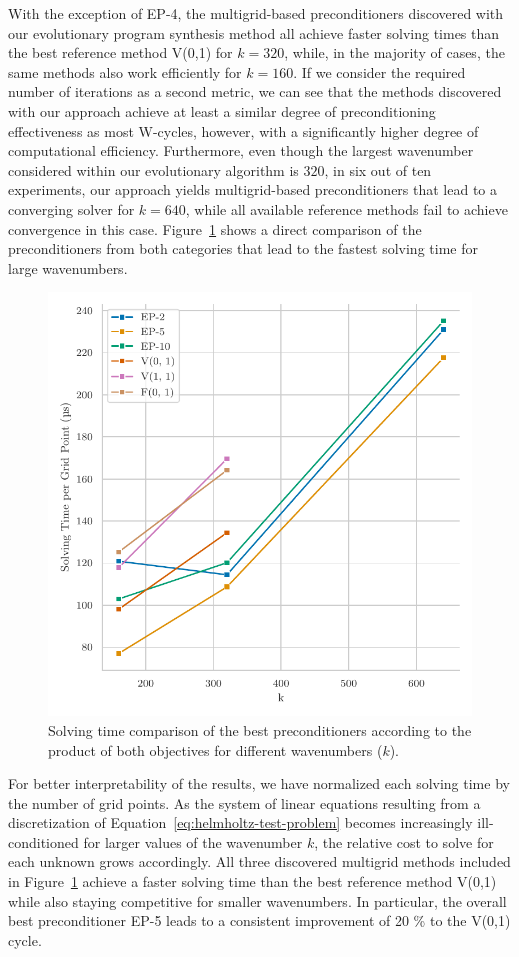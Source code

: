 With the exception of EP-4, the multigrid-based preconditioners discovered with our evolutionary program synthesis method all achieve faster solving times than the best reference method V(0,1) for $k = 320$, while, in the majority of cases, the same methods also work efficiently for $k = 160$.
If we consider the required number of iterations as a second metric, we can see that the methods discovered with our approach achieve at least a similar degree of preconditioning effectiveness as most W-cycles, however, with a significantly higher degree of computational efficiency.
Furthermore, even though the largest wavenumber considered within our evolutionary algorithm is $320$, in six out of ten experiments, our approach yields multigrid-based preconditioners that lead to a converging solver for $k = 640$, while all available reference methods fail to achieve convergence in this case.
Figure~\ref{fig:helmholtz-solving-time-comparison} shows a direct comparison of the preconditioners from both categories that lead to the fastest solving time for large wavenumbers.
\begin{figure}
	\includegraphics[width=\textwidth]{figures/solving-time.pdf}
	\caption{Solving time comparison of the best preconditioners according to the product of both objectives for different wavenumbers ($k$).}
	\label{fig:helmholtz-solving-time-comparison}
\end{figure} 
For better interpretability of the results, we have normalized each solving time by the number of grid points.
As the system of linear equations resulting from a discretization of Equation~\ref{eq:helmholtz-test-problem} becomes increasingly ill-conditioned for larger values of the wavenumber $k$, the relative cost to solve for each unknown grows accordingly.
All three discovered multigrid methods included in Figure~\ref{fig:helmholtz-solving-time-comparison} achieve a faster solving time than the best reference method V(0,1) while also staying competitive for smaller wavenumbers.
In particular, the overall best preconditioner EP-5 leads to a consistent improvement of 20 \% to the V(0,1) cycle.
